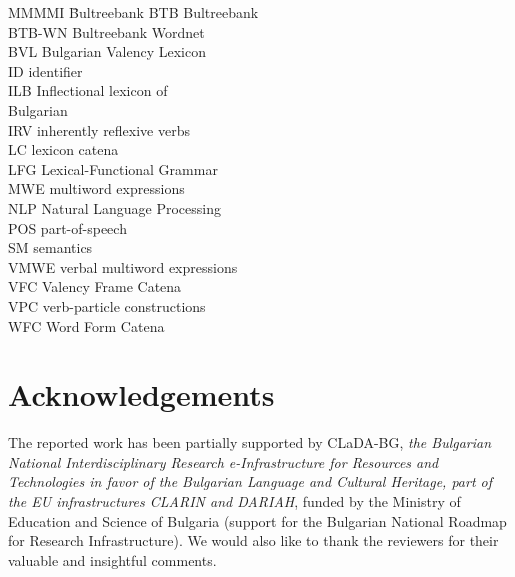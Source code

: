 \documentclass[output=paper,colorlinks,citecolor=brown]{langscibook}
\begin{document}
\begin{multicols}{2}
\begin{tabbing}
MMMMI \= Bultreebank\kill
BTB  \>  Bultreebank \\
BTB-WN  \>  Bultreebank Wordnet \\
BVL  \>  Bulgarian Valency Lexicon \\
ID  \>  identifier \\
ILB  \>  Inflectional lexicon of \\ \> Bulgarian \\
IRV  \>  inherently reflexive verbs \\
LC  \>  lexicon catena \\
LFG  \>  Lexical-Functional Grammar \\
MWE  \>  multiword expressions\\
NLP  \>  Natural Language Processing \\
POS  \>  part-of-speech \\
SM  \>  semantics \\
VMWE  \>  verbal multiword expressions \\
VFC  \>  Valency Frame Catena \\
VPC  \>  verb-particle constructions \\
WFC  \>  Word Form Catena
\end{tabbing}
\end{multicols}


\section*{Acknowledgements}\largerpage

The reported work has been partially supported by CLaDA-BG, \textit{the Bulgarian National Interdisciplinary Research e-Infrastructure for Resources and Technologies in favor of the Bulgarian Language and Cultural Heritage, part of the EU infrastructures CLARIN and DARIAH}, funded by the Ministry of Education and Science of Bulgaria (support for the Bulgarian National Roadmap for Research Infrastructure). We would also like to thank the reviewers for their valuable and insightful comments. 


{\sloppy\printbibliography[heading=subbibliography,notkeyword=this]}
\end{document}
